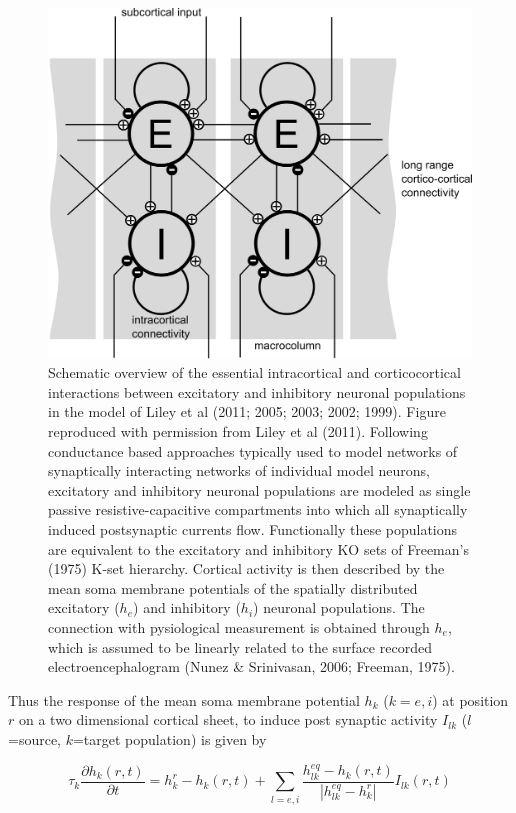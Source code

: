 \documentclass[a4paper,12pt]{article}
\begin{document}
\begin{figure}
\label{fig:liley_schema}
		\includegraphics[scale=0.15]{chosen-frontiers-2012/liley_topology.pdf}
		\caption{Schematic overview of the essential intracortical and corticocortical
interactions between excitatory and inhibitory neuronal
populations in the model of Liley et al (2011; 2005; 2003; 2002;
1999). Figure reproduced with permission from Liley et al (2011).
Following conductance based approaches typically used to model
networks of synaptically interacting networks of individual model
neurons, excitatory and inhibitory neuronal populations are modeled as
single passive resistive-capacitive compartments into which all
synaptically induced postsynaptic currents flow. Functionally these
populations are equivalent to the excitatory and inhibitory KO sets of
Freeman’s (1975) K-set hierarchy. Cortical activity is then described
by the mean soma membrane potentials of the spatially distributed excitatory ($h_e$)
and inhibitory ($h_i$) neuronal populations. The connection with pysiological measurement is obtained through $h_e$,
which is
assumed to be linearly related to the surface recorded
electroencephalogram (Nunez \& Srinivasan, 2006; Freeman, 1975).}
\end{figure}

Thus the response of the mean soma membrane potential $h_k$ ($k=e,i$) at position $r$ on a two dimensional cortical
sheet, to induce post synaptic activity $I_{lk}$ ($l$=source, $k$=target population) is given by

\begin{equation} \label{eq:h_k} 
\tau_k\frac{\partial h_k(r,t)}{\partial t} = h^r_k - h_k(r,t) + \sum_{l=e,i} \frac{h_{lk}^{eq} - h_k(r, t)}{\left|
h_{lk}^{eq}-h_k^r\right|}I_{lk}(r,t)
\end{equation}
\end{document}
